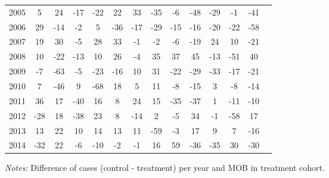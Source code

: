 \begin{table}[H]
\begin{threeparttable}
{\begin{tabular}{l*{13}{c}}
2005        &           5&          24&         -17&         -22&          22&          33&         -35&          -6&         -48&         -29&          -1&         -41\\
2006        &          29&         -14&          -2&           5&         -36&         -17&         -29&         -15&         -16&         -20&         -22&         -58\\
2007        &          19&          30&          -5&          28&          33&          -1&          -2&          -6&         -19&          24&          10&         -21\\
2008        &          10&         -22&         -13&          10&          26&          -4&          35&          37&          45&         -13&         -51&          40\\
2009        &          -7&         -63&          -5&         -23&         -16&          10&          31&         -22&         -29&         -33&         -17&         -21\\
2010        &           7&         -46&           9&         -68&          18&           5&          11&          -8&         -15&           3&          -8&         -14\\
2011        &          36&          17&         -40&          16&           8&          24&          15&         -35&         -37&           1&         -11&         -10\\
2012        &         -28&          18&         -38&          23&           8&         -14&           2&          -5&          34&          -1&         -58&          17\\
2013        &          13&          22&          10&          14&          13&          11&         -59&          -3&          17&           9&           7&         -16\\
2014        &         -32&          22&          -6&         -10&          -2&          -1&          16&          59&         -36&         -35&          30&         -30\\
 \bottomrule \end{tabular} } \begin{tablenotes} \item \scriptsize \emph{Notes:} Difference of cases (control - treatment) per year and MOB in treatment cohort. \end{tablenotes} \end{threeparttable} \end{table} 
